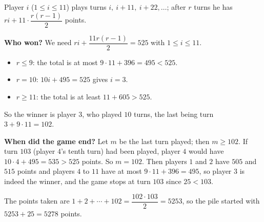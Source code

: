 Player $i$ ($1\le i\le11$) plays turns $i,\ i+11,\ i+22,\dots$; after $r$ turns he has $ri+11\cdot\dfrac{r(r-1)}{2}$ points.

\textbf{Who won?} We need $ri+\dfrac{11r(r-1)}{2}=525$ with $1\le i\le11$.
\begin{itemize}
\item $r\le9$: the total is at most $9\cdot11+396=495<525$.
\item $r=10$: $10i+495=525$ gives $i=3$.
\item $r\ge11$: the total is at least $11+605>525$.
\end{itemize}
So the winner is player $3$, who played $10$ turns, the last being turn $3+9\cdot11=102$.

\textbf{When did the game end?} Let $m$ be the last turn played; then $m\ge102$. If turn $103$ (player $4$'s tenth turn) had been played, player $4$ would have $10\cdot4+495=535>525$ points. So $m=102$. Then players $1$ and $2$ have $505$ and $515$ points and players $4$ to $11$ have at most $9\cdot11+396=495$, so player $3$ is indeed the winner, and the game stops at turn $103$ since $25<103$.

The points taken are $1+2+\cdots+102=\dfrac{102\cdot103}{2}=5253$, so the pile started with $5253+25=\boxed{5278}$ points.

